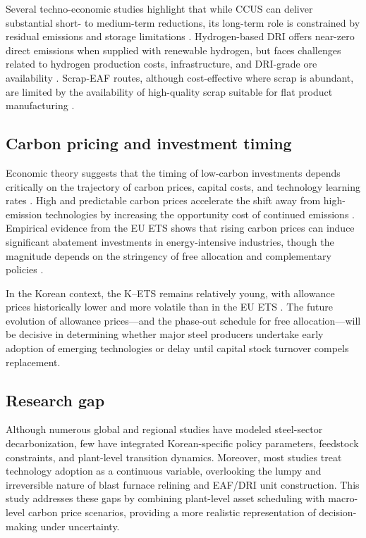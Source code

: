 \documentclass[preprint,5p,authoryear]{elsarticle}
\begin{document}
Several techno-economic studies highlight that while CCUS can deliver substantial short- to medium-term reductions, its long-term role is constrained by residual emissions and storage limitations \citep{fennell2022decarbonising}. Hydrogen-based DRI offers near-zero direct emissions when supplied with renewable hydrogen, but faces challenges related to hydrogen production costs, infrastructure, and DRI-grade ore availability \citep{vogl2018hydrogen}. Scrap-EAF routes, although cost-effective where scrap is abundant, are limited by the availability of high-quality scrap suitable for flat product manufacturing \citep{IEA2020steel}.

\subsection{Carbon pricing and investment timing}
Economic theory suggests that the timing of low-carbon investments depends critically on the trajectory of carbon prices, capital costs, and technology learning rates \citep{grubb2014planetary}. High and predictable carbon prices accelerate the shift away from high-emission technologies by increasing the opportunity cost of continued emissions \citep{pizer2002combining}. Empirical evidence from the EU ETS shows that rising carbon prices can induce significant abatement investments in energy-intensive industries, though the magnitude depends on the stringency of free allocation and complementary policies \citep{calel2016innovation}.

In the Korean context, the K--ETS remains relatively young, with allowance prices historically lower and more volatile than in the EU ETS \citep{kim2021kets}. The future evolution of allowance prices—and the phase-out schedule for free allocation—will be decisive in determining whether major steel producers undertake early adoption of emerging technologies or delay until capital stock turnover compels replacement.

\subsection{Research gap}
Although numerous global and regional studies have modeled steel-sector decarbonization, few have integrated Korean-specific policy parameters, feedstock constraints, and plant-level transition dynamics. Moreover, most studies treat technology adoption as a continuous variable, overlooking the lumpy and irreversible nature of blast furnace relining and EAF/DRI unit construction. This study addresses these gaps by combining plant-level asset scheduling with macro-level carbon price scenarios, providing a more realistic representation of decision-making under uncertainty.
\end{document}

